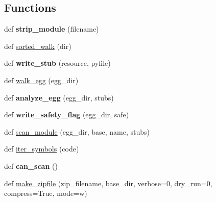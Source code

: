 \subsection*{Functions}
\begin{DoxyCompactItemize}
\item 
\mbox{\label{namespacesetuptools_1_1command_1_1bdist__egg_a2a58a1997d8099deae92ca117efa2bc0}} 
def {\bfseries strip\+\_\+module} (filename)
\item 
def \hyperlink{namespacesetuptools_1_1command_1_1bdist__egg_a475ca685e10db35e7fdf57cf2d1cad05}{sorted\+\_\+walk} (dir)
\item 
\mbox{\label{namespacesetuptools_1_1command_1_1bdist__egg_ab10fa2ab8a63f014f990f6d38085ea56}} 
def {\bfseries write\+\_\+stub} (resource, pyfile)
\item 
def \hyperlink{namespacesetuptools_1_1command_1_1bdist__egg_ac8cbe5e3bca6f6a198d15421a238c141}{walk\+\_\+egg} (egg\+\_\+dir)
\item 
\mbox{\label{namespacesetuptools_1_1command_1_1bdist__egg_a006cd7effcbb632204ea3f7f23e751d5}} 
def {\bfseries analyze\+\_\+egg} (egg\+\_\+dir, stubs)
\item 
\mbox{\label{namespacesetuptools_1_1command_1_1bdist__egg_a3b02f991a66601479e8a3b265608226e}} 
def {\bfseries write\+\_\+safety\+\_\+flag} (egg\+\_\+dir, safe)
\item 
def \hyperlink{namespacesetuptools_1_1command_1_1bdist__egg_a7934760ce13e5b455dbd1d6d846ceb03}{scan\+\_\+module} (egg\+\_\+dir, base, name, stubs)
\item 
def \hyperlink{namespacesetuptools_1_1command_1_1bdist__egg_a9495041e4a8f92950d2bdb36aa77c687}{iter\+\_\+symbols} (code)
\item 
\mbox{\label{namespacesetuptools_1_1command_1_1bdist__egg_a7a71ad90d0371c4eba9cc117659dce07}} 
def {\bfseries can\+\_\+scan} ()
\item 
def \hyperlink{namespacesetuptools_1_1command_1_1bdist__egg_a4095fa33cd60e2569800461be97be563}{make\+\_\+zipfile} (zip\+\_\+filename, base\+\_\+dir, verbose=0, dry\+\_\+run=0, compress=True, mode=\textquotesingle{}w\textquotesingle{})
\end{DoxyCompactItemize}
